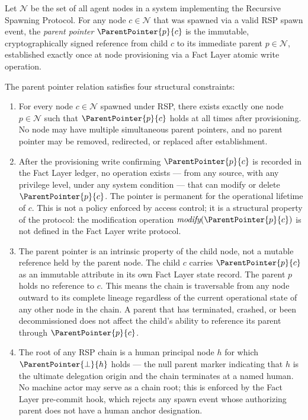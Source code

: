 \begin{definition}
\label{def:parent-pointer}
Let $\mathcal{N}$ be the set of all agent nodes in a \bxthree{} system implementing the Recursive Spawning Protocol. For any node $c \in \mathcal{N}$ that was spawned via a valid RSP spawn event, the \emph{parent pointer} $\ParentPointer{p}{c}$ is the immutable, cryptographically signed reference from child $c$ to its immediate parent $p \in \mathcal{N}$, established exactly once at node provisioning via a Fact Layer atomic write operation.

The parent pointer relation satisfies four structural constraints:

\begin{enumerate}
    \item[(P1) \textbf{Uniqueness}] For every node $c \in \mathcal{N}$ spawned under RSP, there exists exactly one node $p \in \mathcal{N}$ such that $\ParentPointer{p}{c}$ holds at all times after provisioning. No node may have multiple simultaneous parent pointers, and no parent pointer may be removed, redirected, or replaced after establishment.

    \item[(P2) \textbf{Immutability}] After the provisioning write confirming $\ParentPointer{p}{c}$ is recorded in the Fact Layer ledger, no operation exists --- from any source, with any privilege level, under any system condition --- that can modify or delete $\ParentPointer{p}{c}$. The pointer is permanent for the operational lifetime of $c$. This is not a policy enforced by access control; it is a structural property of the protocol: the modification operation $\textit{modify}(\ParentPointer{p}{c})$ is not defined in the Fact Layer write protocol.

    \item[(P3) \textbf{Directionality}] The parent pointer is an intrinsic property of the child node, not a mutable reference held by the parent node. The child $c$ carries $\ParentPointer{p}{c}$ as an immutable attribute in its own Fact Layer state record. The parent $p$ holds no reference to $c$. This means the chain is traversable from any node outward to its complete lineage regardless of the current operational state of any other node in the chain. A parent that has terminated, crashed, or been decommissioned does not affect the child's ability to reference its parent through $\ParentPointer{p}{c}$.

    \item[(P4) \textbf{Termination at Human Anchor}] The root of any RSP chain is a human principal node $h$ for which $\ParentPointer{\bot}{h}$ holds --- the null parent marker indicating that $h$ is the ultimate delegation origin and the chain terminates at a named human. No machine actor may serve as a chain root; this is enforced by the Fact Layer pre-commit hook, which rejects any spawn event whose authorizing parent does not have a human anchor designation.
\end{enumerate}
\end{definition}

